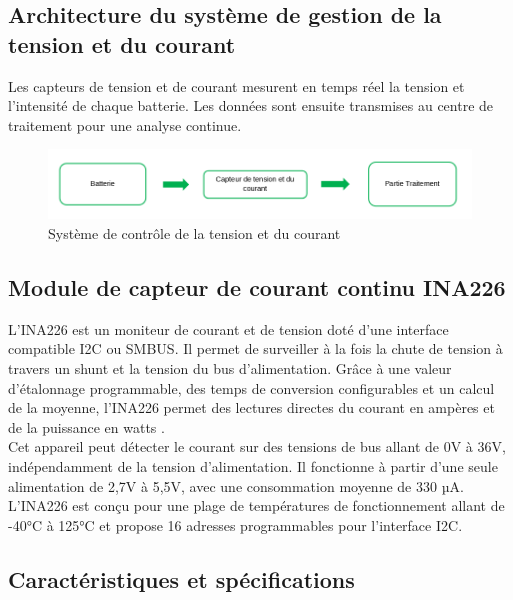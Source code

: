 \subsection*{Architecture du système de gestion de la tension et du courant}
Les capteurs de tension et de courant mesurent en temps réel la tension et l'intensité de chaque batterie. Les données sont ensuite transmises au centre de traitement pour une analyse continue.

\begin{figure}[H]
	\centering
	\includegraphics[width=17cm]{./img/capteurTensionCOurant.png}
	\caption{Système de contrôle de la tension et du courant }
	\label{i1}
\end{figure}

\subsection*{Module de capteur de courant continu INA226}
L'INA226 est un moniteur de courant et de tension doté d'une interface compatible I2C ou SMBUS. Il permet de surveiller à la fois la chute de tension à travers un shunt et la tension du bus d'alimentation. Grâce à une valeur d'étalonnage programmable, des temps de conversion configurables et un calcul de la moyenne, l'INA226 permet des lectures directes du courant en ampères et de la puissance en watts \cite{6}.\\

Cet appareil peut détecter le courant sur des tensions de bus allant de 0V à 36V, indépendamment de la tension d'alimentation. Il fonctionne à partir d'une seule alimentation de 2,7V à 5,5V, avec une consommation moyenne de 330 µA. L'INA226 est conçu pour une plage de températures de fonctionnement allant de -40°C à 125°C et propose 16 adresses programmables pour l'interface I2C.\\

\subsection*{Caractéristiques et spécifications}

